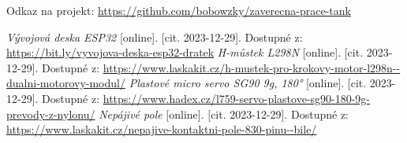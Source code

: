 \documentclass[12pt, a4paper,
oneside
openany
]{report}
\begin{document}
\noindent Odkaz na projekt: \url{https://github.com/bobowzky/zaverecna-prace-tank}
	
	\begin{thebibliography}{99}
		 \textit{Vývojová deska ESP32} [online]. [cit. 2023-12-29]. Dostupné z: \url{https://bit.ly/vyvojova-deska-esp32-dratek}
		\textit{H-můstek L298N} [online]. [cit. 2023-12-29]. Dostupné z: \url{https://www.laskakit.cz/h-mustek-pro-krokovy-motor-l298n--dualni-motorovy-modul/}
        \textit{Plastové micro servo SG90 9g, 180°} [online]. [cit. 2023-12-29]. Dostupné z: \url{https://www.hadex.cz/l759-servo-plastove-sg90-180-9g-prevody-z-nylonu/}
        \textit{Nepájivé pole} [online]. [cit. 2023-12-29]. Dostupné z: \url{https://www.laskakit.cz/nepajive-kontaktni-pole-830-pinu--bile/}
	\end{thebibliography}
	
	\listoffigures
	
	
	[\vspace{-22pt}] %
\end{document}
